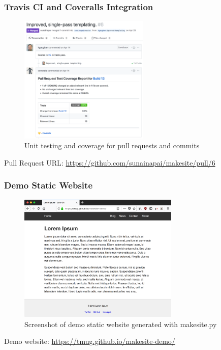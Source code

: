 \documentclass{beamer}
\newcommand{\linkcaption}[1]{
    \centering \scriptsize #1
}
\begin{document}
\begin{frame}
    \frametitle{Travis CI and Coveralls Integration}

    \begin{figure}
        \centering
        \includegraphics[height=2.4in]{makesite-coverage.png}
        \caption{Unit testing and coverage for pull requests and commits}
    \end{figure}

    \linkcaption{
        Pull Request URL: \url{https://github.com/sunainapai/makesite/pull/6}
    }
\end{frame}


\begin{frame}
    \frametitle{Demo Static Website}

    \begin{figure}
        \centering
        \includegraphics[height=2.4in]{makesite-demo-home.png}
        \caption{Screenshot of demo static website generated with makesite.py}
    \end{figure}

    \linkcaption{
        Demo website: \url{https://tmug.github.io/makesite-demo/}
    }
\end{frame}
\end{document}
